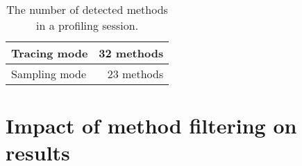 \begin{table}[H]
\centering
    \begin{tabular}{|l|r|}
        \hline
        Tracing mode  & 32 methods \\ \hline
        Sampling mode & 23 methods \\
        \hline
    \end{tabular}
     \caption{The number of detected methods in a profiling session. }
    \label{07tbl:compareResultsExactness}
\end{table}

\section{Impact of method filtering on results}


